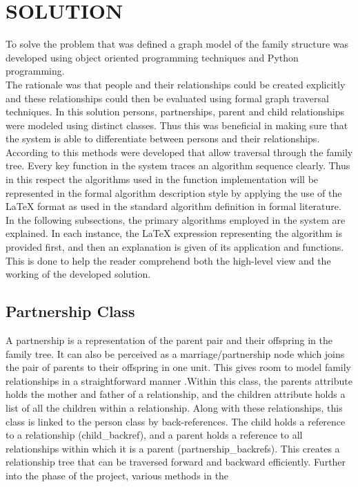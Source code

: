 \documentclass[
]{article}
\begin{document}
\section{SOLUTION}\label{solution} To solve the problem that was defined a graph model of the family
structure was developed using object oriented programming techniques and
Python programming.\\
The rationale was that people and their relationships could be created
explicitly and these relationships could then be evaluated using formal
graph traversal techniques. In this solution persons, partnerships, parent and child relationships
were modeled using distinct classes. Thus this was beneficial in making
sure that the system is able to differentiate between persons and their
relationships. According to this methods were developed that allow
traversal through the family tree. Every key function in the system traces an algorithm sequence clearly.
Thus in this respect the algorithms used in the function implementation
will be represented in the formal algorithm description style by
applying the use of the LaTeX format as used in the standard algorithm
definition in formal literature. In the following subsections, the primary algorithms employed in the
system are explained. In each instance, the LaTeX expression
representing the algorithm is provided first, and then an explanation is
given of its application and functions. This is done to help the reader
comprehend both the high-level view and the working of the developed
solution. \subsection{Partnership Class}\label{partnership-class} A partnership is a representation of the parent pair and their offspring
in the family tree. It can also be perceived as a marriage/partnership
node which joins the pair of parents to their offspring in one unit. This gives room to model family relationships in a straightforward
manner .Within this class, the parents attribute holds the mother and
father of a relationship, and the children attribute holds a list of all
the children within a relationship. Along with these relationships, this
class is linked to the person class by back-references. The child holds
a reference to a relationship (child\_backref), and a parent holds a
reference to all relationships within which it is a parent
(partnership\_backrefs). This creates a relationship tree that can be
traversed forward and backward efficiently. Further into the phase of the project, various methods in the
\end{document}

